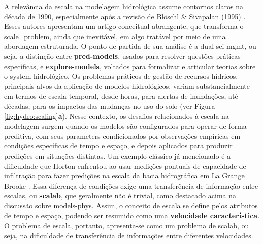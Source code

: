 \documentclass[./main.tex]{subfiles}
\begin{document}
\par A relevância da escala na modelagem hidrológica assume contornos claros na década de 1990, especialmente após a revisão de Blöschl \& Sivapalan (1995) \cite{Bloschl1995a}. Esses autores apresentam um artigo conceitual abrangente, que transforma o \gls{scale_problem}, ainda que inevitável, em algo tratável por meio de uma abordagem estruturada. O ponto de partida de sua análise é a \gls{dual-sci-mgmt}, ou seja, a distinção entre \textbf{\gls{pred-models}}, usados para resolver questões práticas específicas, e \textbf{\gls{explore-models}}, voltados para formalizar e articular teorias sobre o \gls{system} hidrológico. Os problemas práticos de gestão de recursos hídricos, principais alvos da aplicação de modelos hidrológicos, variam substancialmente em termos de escala temporal, desde horas, para alertas de inundações, até décadas, para os impactos das mudanças no uso do solo (ver Figura \ref{fig:hydro:scaling}\textbf{a}). Nesse contexto, os desafios relacionados à escala na modelagem surgem quando os modelos são configurados para operar de forma preditiva, com seus \gls{parameters} condicionados por observações empíricas em condições específicas de tempo e espaço, e depois aplicados para produzir predições em situações distintas. Um exemplo clássico já mencionado é a dificuldade que Horton enfrentou ao usar medições pontuais de capacidade de infiltração para fazer predições na escala da bacia hidrográfica em La Grange Brooke \cite{Beven2004c}. Essa diferença de condições exige uma transferência de informação entre escalas, ou \textbf{\gls{scalab}}, que geralmente não é trivial, como destacado acima na discussão sobre \gls{models-phys}. Assim, o conceito de escala se define pelos atributos de tempo e espaço, podendo ser resumido como uma \textbf{velocidade característica}. O problema de escala, portanto, apresenta-se como um problema de \gls{scalab}, ou seja, na dificuldade de transferência de informações entre diferentes velocidades.
\end{document}
